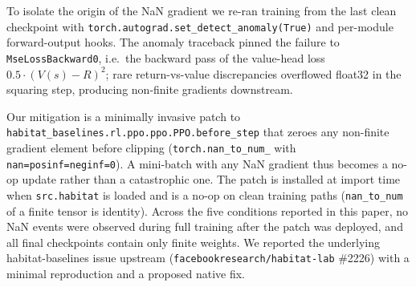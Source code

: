 \documentclass[10pt,conference,compsocconf]{IEEEtran}
\begin{document}
To isolate the origin of the NaN gradient we re-ran training from the last clean checkpoint with \texttt{torch.autograd.set\_detect\_anomaly(True)} and per-module forward-output hooks. The anomaly traceback pinned the failure to \texttt{MseLossBackward0}, i.e.\ the backward pass of the value-head loss~$0.5 \cdot (V(s) - R)^2$; rare return-vs-value discrepancies overflowed float32 in the squaring step, producing non-finite gradients downstream.

Our mitigation is a minimally invasive patch to \texttt{habitat\_baselines.rl.ppo.ppo.PPO.before\_step} that zeroes any non-finite gradient element before clipping (\texttt{torch.nan\_to\_num\_} with \texttt{nan=posinf=neginf=0}). A mini-batch with any NaN gradient thus becomes a no-op update rather than a catastrophic one. The patch is installed at import time when \texttt{src.habitat} is loaded and is a no-op on clean training paths (\texttt{nan\_to\_num} of a finite tensor is identity). Across the five conditions reported in this paper, no NaN events were observed during full training after the patch was deployed, and all final checkpoints contain only finite weights. We reported the underlying habitat-baselines issue upstream (\texttt{facebookresearch/habitat-lab} \#2226) with a minimal reproduction and a proposed native fix.
\end{document}
